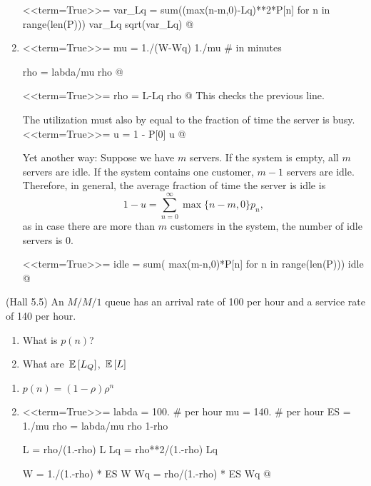 \begin{question}
\begin{solution}
\begin{enumerate}
<<term=True>>=
var_Lq = sum((max(n-m,0)-Lq)**2*P[n] for n in range(len(P)))
var_Lq
sqrt(var_Lq)
@ 

\item 

<<term=True>>=
mu = 1./(W-Wq)
1./mu # in minutes

rho = labda/mu
rho
@ 

<<term=True>>=
rho = L-Lq
rho
@ 
This checks the previous line.

The utilization must also by equal to the fraction of time the server is busy. 
<<term=True>>=
u = 1 - P[0]
u
@ 

Yet another way: Suppose we have $m$ servers. If the system is empty,
all $m$ servers are idle. If the system contains one customer, $m-1$
servers are idle. Therefore, in general, the average fraction of time
the server is idle is
\begin{equation*}
1- u = \sum_{n=0}^\infty \max\{n-m, 0\}  p_n,
\end{equation*}
as in case there are more than $m$ customers in the system, the
number of idle servers is $0$.


<<term=True>>=
idle = sum( max(m-n,0)*P[n] for n in range(len(P)))
idle
@ 
  \end{enumerate}
   \end{solution}
 
\end{question}

\begin{question}
  (Hall 5.5) An $M/M/1$ queue has an arrival rate of 100 per hour and
  a service rate of 140 per hour.
  \begin{enumerate}
  \item What is $p(n)$?
\item What are $\,\mathbb{E}\left[L_Q\right]$, $\,\mathbb{E}\left[L\right]$ 
\end{enumerate}

\begin{solution}
  \begin{enumerate}
  \item 
$p(n) = (1-\rho)\rho^n$

\item 

<<term=True>>=
labda = 100. # per hour
mu = 140. # per hour
ES = 1./mu
rho = labda/mu
rho 
1-rho

L = rho/(1.-rho)
L
Lq = rho**2/(1.-rho)
Lq

W = 1./(1.-rho) * ES
W
Wq = rho/(1.-rho) * ES
Wq
@ 
  \end{enumerate}
  \end{solution}
\end{question}

